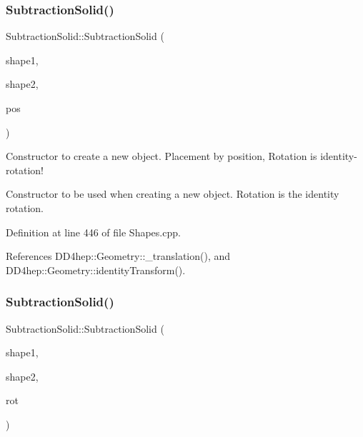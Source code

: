 \subsubsection{\texorpdfstring{Subtraction\+Solid()}{SubtractionSolid()}\hspace{0.1cm}{\footnotesize\ttfamily [5/8]}}
{\footnotesize\ttfamily Subtraction\+Solid\+::\+Subtraction\+Solid (\begin{DoxyParamCaption}\item[{const \hyperlink{namespace_d_d4hep_1_1_geometry_a83de90a8dcc7378ba47d54ef9a6a687b}{Solid} \&}]{shape1,  }\item[{const \hyperlink{namespace_d_d4hep_1_1_geometry_a83de90a8dcc7378ba47d54ef9a6a687b}{Solid} \&}]{shape2,  }\item[{const \hyperlink{namespace_d_d4hep_1_1_geometry_a55083902099d03506c6db01b80404900}{Position} \&}]{pos }\end{DoxyParamCaption})}



Constructor to create a new object. Placement by position, Rotation is identity-\/rotation! 

Constructor to be used when creating a new object. Rotation is the identity rotation. 

Definition at line 446 of file Shapes.\+cpp.



References D\+D4hep\+::\+Geometry\+::\+\_\+translation(), and D\+D4hep\+::\+Geometry\+::identity\+Transform().

\hypertarget{class_d_d4hep_1_1_geometry_1_1_subtraction_solid_ac9c6a2de374c53eacf01eaa2ee759638}{}\label{class_d_d4hep_1_1_geometry_1_1_subtraction_solid_ac9c6a2de374c53eacf01eaa2ee759638} 
\subsubsection{\texorpdfstring{Subtraction\+Solid()}{SubtractionSolid()}\hspace{0.1cm}{\footnotesize\ttfamily [6/8]}}
{\footnotesize\ttfamily Subtraction\+Solid\+::\+Subtraction\+Solid (\begin{DoxyParamCaption}\item[{const \hyperlink{namespace_d_d4hep_1_1_geometry_a83de90a8dcc7378ba47d54ef9a6a687b}{Solid} \&}]{shape1,  }\item[{const \hyperlink{namespace_d_d4hep_1_1_geometry_a83de90a8dcc7378ba47d54ef9a6a687b}{Solid} \&}]{shape2,  }\item[{const \hyperlink{namespace_d_d4hep_1_1_geometry_a24667b2b9c3cec3d5239828db4d52189}{Rotation\+Z\+YX} \&}]{rot }\end{DoxyParamCaption})}



